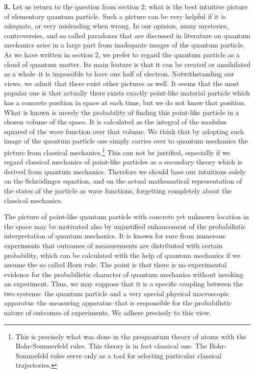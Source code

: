\documentclass[12pt]{article}
\begin{document}
{\bf 3.} Let us return to the question from section 2: what is the best intuitive picture of elementary quantum particle. Such a picture can be very helpful if it is adequate, or very misleading when wrong. In our opinion, many mysteries, controversies, and so called paradoxes that are discussed in literature on quantum mechanics arise in a large part from inadequate images of the quantum particle. As we have written in section 2, we prefer to regard
 the quantum particle as a cloud of quantum matter. Its main feature is that it can be created or annihilated as a whole--it is impossible to have one half of electron. Notwithstanding our views, we admit that there exist other pictures as well. It seems that the most popular one is that actually there exists exactly point-like material particle which has a concrete position in space at each time, but we do not know that position. What is known is merely the probability of finding this point-like particle in a chosen volume of the space. It is calculated as the integral of the modulus squared of the wave function over that volume. We think that by adopting such image of the quantum particle one simply carries over to quantum mechanics the picture from classical mechanics.\footnote{This is precisely what was done in the prequantum theory of atoms with the Bohr-Sommerfeld rules. This theory is in fact classical one. The Bohr-Sommefeld rules serve only as a tool for selecting particular classical trajectories.} This can not be justified, especially if we regard classical mechanics of point-like particles as a secondary theory which is derived from quantum mechanics. Therefore we should base our intuitions solely on the Schr\"odinger equation, and on the actual mathematical representation of the states of the particle as wave functions, forgetting completely about the classical mechanics. 

The picture of point-like quantum particle with concrete yet unknown location in the space may be motivated also by unjustified enhancement of the probabilistic interpretation of quantum mechanics. It is known for sure from numerous experiments that outcomes of measurements are distributed with certain probability, which can be calculated with the help of quantum mechanics if we assume the so called Born rule. The point is that there is no experimental evidence for the probabilistic character of quantum mechanics without invoking an experiment. Thus, we may suppose that it is a specific coupling between the two systems: the quantum particle and a very special physical macroscopic apparatus--the measuring apparatus--that is responsible for the probabilistic nature of outcomes of experiments. We adhere precisely to this view. 
\end{document}
